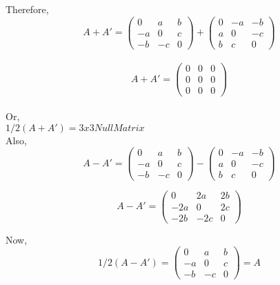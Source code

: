 \documentclass{article}
\begin{document}
\begin{itemize}
Therefore,\\

 \[
 A+A'=
 \begin{pmatrix}
 0 & a & b\\
 -a & 0 & c\\
 -b & -c & 0
 \end{pmatrix}
 +
  \begin{pmatrix}
 0 & -a & -b\\
 a & 0 & -c\\
 b & c & 0
 \end{pmatrix}
 \]
\\

\[
 A+A'=
 \begin{pmatrix}
 0 & 0 & 0\\
 0 & 0 & 0\\
 0 & 0 & 0
 \end{pmatrix}
\]\\

Or,\\

$

1/2(A+A')=3x3 Null Matrix
$\\

Also,\\

 \[
 A-A'=
 \begin{pmatrix}
 0 & a & b\\
 -a & 0 & c\\
 -b & -c & 0
 \end{pmatrix}
 -
  \begin{pmatrix}
 0 & -a & -b\\
 a & 0 & -c\\
 b & c & 0
 \end{pmatrix}
 \]
 
 
  \[
 A-A'=
 \begin{pmatrix}
 0 & 2a & 2b\\
 -2a & 0 & 2c\\
 -2b & -2c & 0
 \end{pmatrix}
\]

Now,\\

\[
 1/2(A-A')=
 \begin{pmatrix}
 0 & a & b\\
 -a & 0 & c\\
 -b & -c & 0
 \end{pmatrix}
 =
 A
\]\\
\end{itemize}
\end{document}
